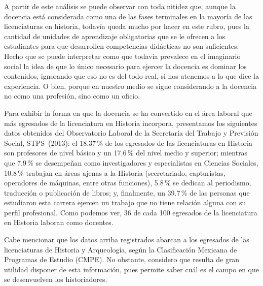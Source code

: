 A partir de este análisis se puede observar con toda nitidez que, 
aunque la docencia está considerada como una de las fases terminales 
en la mayoría de las licenciaturas en historia, todavía queda 
mucho por hacer en este rubro, pues la cantidad de unidades de aprendizaje 
obligatorias que se le ofrecen a los estudiantes para que desarrollen 
competencias didácticas no son suficientes. Hecho que se puede interpretar 
como que todavía prevalece en el imaginario social la idea de que lo 
único necesario para ejercer la docencia es dominar los contenidos, ignorando
que eso no es del todo real, si nos atenemos a lo que dice la experiencia. 
O bien, porque en nuestro medio se sigue considerando a la docencia no como 
una profesión, sino como un oficio.

Para exhibir la forma en que la docencia se ha convertido en el área 
laboral que más egresados de la licenciatura en Historia incorpora, 
presentamos los siguientes datos obtenidos del Observatorio 
Laboral de la Secretaría del Trabajo y Previsión Social, STPS~(2013): 
el 18.37\,\% de los egresados de las licenciaturas en Historia son 
profesores de nivel básico y un 17.6\,\% del nivel medio y 
superior; mientras que 7.9\,\% se desempeñan como investigadores y especialistas 
en Ciencias Sociales, 10.8\,\% trabajan en  áreas ajenas a la Historia 
(secretariado, capturistas, operadores de máquinas, entre 
otras funciones), 5.8\,\%  se dedican al periodismo, traducción o  
publicación de libros; y, finalmente, un 39.7\,\% de las personas que 
estudiaron esta carrera ejercen un trabajo que no tiene relación alguna con su 
perfil profesional. Como podemos ver, 36 de cada 100 egresados 
de la licenciatura en Historia laboran como docentes. 
\newpage

Cabe mencionar que los  datos arriba registrados abarcan a los 
egresados de las licenciaturas de Historia y Arqueología, según la 
Clasificación Mexicana de Programas de Estudio (CMPE). No obstante,
considero que resulta de gran utilidad  disponer de esta 
información, pues permite saber cuál es el campo en que se 
desenvuelven los  historiadores. 

\bigskip
{}


